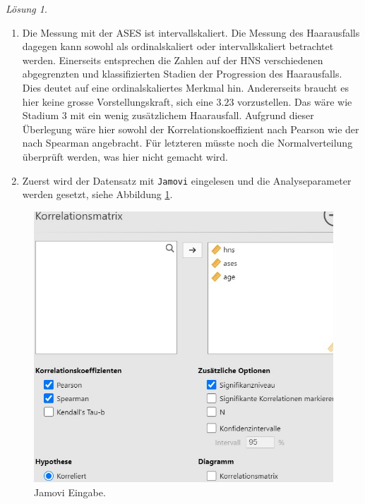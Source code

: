 \documentclass[
]{book}
\providecommand{\tightlist}{%
  \setlength{\itemsep}{0pt}\setlength{\parskip}{0pt}}
\theoremstyle{definition}
\theoremstyle{definition}
\theoremstyle{definition}
\theoremstyle{definition}
\theoremstyle{remark}
\newtheorem*{solution}{Lösung}
\begin{document}
\begin{solution}
\leavevmode

\begin{enumerate}
\def\labelenumi{\alph{enumi})}
\tightlist
\item
  Die Messung mit der ASES ist intervallskaliert. Die Messung des Haarausfalls dagegen kann sowohl als ordinalskaliert oder intervallskaliert betrachtet werden. Einerseits entsprechen die Zahlen auf der HNS verschiedenen abgegrenzten und klassifizierten Stadien der Progression des Haarausfalls. Dies deutet auf eine ordinalskaliertes Merkmal hin. Andererseits braucht es hier keine grosse Vorstellungskraft, sich eine \(3.23\) vorzustellen. Das wäre wie Stadium \(3\) mit ein wenig zusätzlichem Haarausfall. Aufgrund dieser Überlegung wäre hier sowohl der Korrelationskoeffizient nach Pearson wie der nach Spearman angebracht. Für letzteren müsste noch die Normalverteilung überprüft werden, was hier nicht gemacht wird.
\item
  Zuerst wird der Datensatz mit \texttt{Jamovi} eingelesen und die Analyseparameter werden gesetzt, siehe Abbildung \ref{fig:sol-hairloss-sex-input-spearman}.
\end{enumerate}

\begin{figure}
\includegraphics[width=1\linewidth]{figures/08-exr-hairloss-sex-jmv-input-spearman} \caption{Jamovi Eingabe.}\label{fig:sol-hairloss-sex-input-spearman}
\end{figure}


\end{solution}
\end{document}
